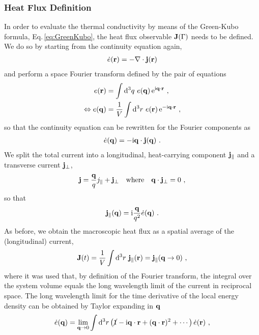 \subsubsection{Heat Flux Definition}
In order to evaluate the thermal conductivity by means of the Green-Kubo formula, Eq.\,\eqref{eq:GreenKubo}, the  heat flux observable ${\bf J} (\Gamma)$ needs to be defined. We do so by starting from the continuity equation again,
\begin{align}
	\dot{e} ({\bf r}) = - {\bf \nabla} \cdot {\bf j} ({\bf r})
	\label{eq:hf.cont}
\end{align}
and perform a space Fourier transform defined by the pair of equations
\begin{align}
	e({\bf r}) 
		&= \int {\rm d}^3 q ~ e({\bf q}) \, {\rm e}^{{\rm i} {\bf q} \cdot {\bf r}} ~,
		\label{eq:hf.ft.r} \\
	\Leftrightarrow
	e({\bf q}) 
		&= \frac{1}{V} \int {\rm d}^3 r ~ e({\bf r}) \, {\rm e}^{-{\rm i} {\bf q} \cdot {\bf r}} ~,
	\label{eq:hf.ft.2}
\end{align}
so that the continuity equation can be rewritten for the Fourier components as
\begin{align}
	\dot{e} ({\bf q})
		= - {\rm i} {\bf q} \cdot {\bf j} ({\bf q})~.
	\label{eq:hf.ft.cont.q}
\end{align}
We split the total current into a longitudinal, heat-carrying component ${\bf j}_{\parallel}$ and a transverse current ${\bf j}_{\perp}$,
\begin{align}
	{\bf j} = \frac{{\bf q}}{q} j_{\parallel} + {\bf j}_{\perp} \quad\text{where}\quad {\bf q} \cdot {\bf j}_{\perp} = 0~,
\end{align}
so that
\begin{align}
	{\bf j}_{\parallel} ({\bf q})
		= {\rm i} \frac{{\bf q}}{q^2} \dot{e} ({\bf q})~.
  \label{eq:hf.j.parallel}
\end{align}
As before, we obtain the macroscopic heat flux as a spatial average of the (longitudinal) current,
\begin{align}
	{\bf J} (t) = \frac{1}{V} \int {\rm d}^3 r ~ {\bf j}_{\parallel} ({\bf r}) = {\bf j}_{\parallel} ({\bf q} \to 0)~,
	\label{eq:hf.J.1}
\end{align}
where it was used that, by definition of the Fourier transform, the integral over the system volume equals the long wavelength limit of the current in reciprocal space. The long wavelength limit for the time derivative of the local energy density can be obtained by Taylor expanding in ${\bf q}$
\begin{align}
	\dot{e} ({\bf q}) 
		= \lim_{{\bf q} \to 0} \int {\rm d}^3 r \left(\cancel{1} - {\rm i} {\bf q} \cdot {\bf r} + ({\bf q} \cdot {\bf r})^2 + \cdots \right) \dot{e} ({\bf r})~,
	\label{eq:hf.e.lw}
\end{align}
